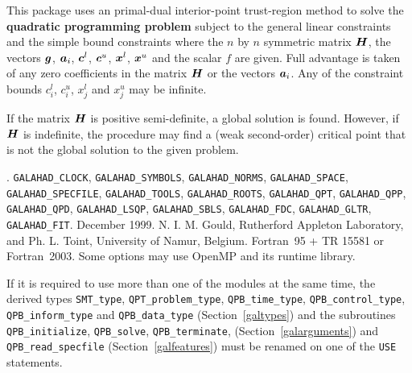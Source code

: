 \documentclass{galahad}
\newcommand{\packagename}{QPB}
\newcommand{\fullpackagename}{\libraryname\_\packagename}
\begin{document}
\galheader


\galsummary
This package uses an primal-dual interior-point trust-region method
to solve the {\bf quadratic programming problem}
subject to the general linear constraints
and the simple bound constraints
where the $n$ by $n$ symmetric matrix ${\bm{H}}$, the 
vectors ${\bm{g}}$, ${\bm{a}}_{i}$, ${\bm{c}}^{l}$, ${\bm{c}}^{u}$, ${\bm{x}}^{l}$, 
${\bm{x}}^{u}$ and the scalar $f$ are given.
Full advantage is taken of any zero coefficients in the matrix ${\bm{H}}$ or the
vectors ${\bm{a}}_{i}$. 
Any of the constraint bounds $c_{i}^{l}$, $c_{i}^{u}$, 
$x_{j}^{l}$ and $x_{j}^{u}$ may be infinite.

If the matrix ${\bm{H}}$ is positive semi-definite, a global
solution is found. However, if ${\bm{H}}$ is indefinite,
the procedure may find  a (weak second-order) critical point 
that is not the global solution to the given problem.


\galattributes
\galversions{\tt  \fullpackagename\_single, \fullpackagename\_double}.
\galuses 
{\tt GALAHAD\_\-CLOCK},
{\tt GALAHAD\_SY\-M\-BOLS}, 
{\tt GALAHAD\-\_NORMS}, 
{\tt GALAHAD\_SPACE}, 
{\tt GALAHAD\_SPECFILE},
{\tt GALAHAD\_TOOLS}, 
{\tt GALAHAD\_ROOTS}, 
{\tt GALAHAD\_QPT},
{\tt GA\-LAHAD\_QPP}, 
{\tt GALA\-HAD\_QPD},
{\tt GALAHAD\_LSQP}, 
{\tt GALAHAD\_SBLS},
{\tt GALAHAD\_FDC}, 
{\tt GALAHAD\_GLTR}, 
{\tt GALAHAD\_FIT}.
\galdate December 1999.
\galorigin N. I. M. Gould, Rutherford Appleton Laboratory, and
Ph. L. Toint, University of Namur, Belgium.
\gallanguage Fortran~95 + TR 15581 or Fortran~2003. 
\galparallelism Some options may use OpenMP and its runtime library.


\galhowto



\noindent
If it is required to use more than one of the modules at the same time, 
the derived types
{\tt SMT\_type}, 
{\tt QPT\_problem\_type}, 
{\tt \packagename\_time\_type}, 
{\tt \packagename\_control\_type}, 
{\tt \packagename\_inform\_type} 
and
{\tt \packagename\_data\_type}
(Section~\ref{galtypes})
and the subroutines
{\tt \packagename\_initialize}, 
{\tt \packagename\_\-solve},
{\tt \packagename\_terminate},
(Section~\ref{galarguments})
and 
{\tt \packagename\_read\_specfile}
(Section~\ref{galfeatures})
must be renamed on one of the {\tt USE} statements.
\end{document}
